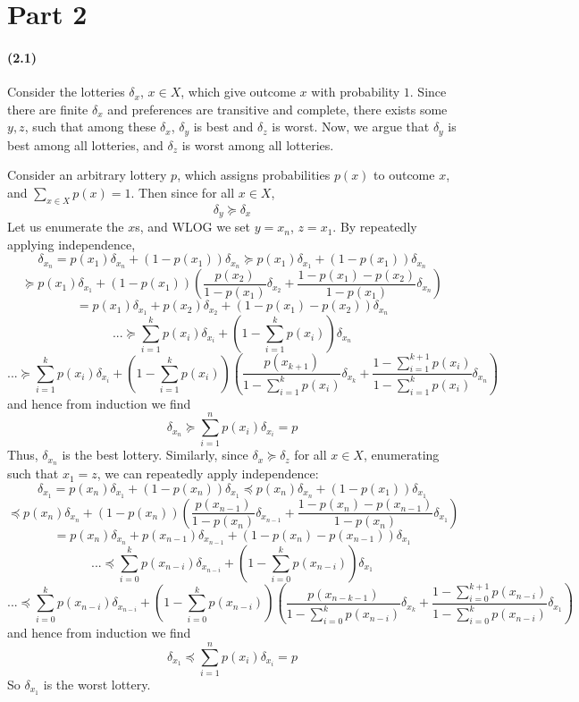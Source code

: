 \documentclass[10pt,letter]{article}
\begin{document}
\section*{Part 2}
\paragraph{(2.1)}
Consider the lotteries $\delta_x$, $x \in X$, which give outcome $x$ with probability $1$. Since there are finite $\delta_x$ and preferences are transitive and complete, there exists some $y,z$, such that among these $\delta_x$, $\delta_y$ is best and $\delta_z$ is worst. Now, we argue that $\delta_y$ is best among all lotteries, and $\delta_z$ is worst among all lotteries.

Consider an arbitrary lottery $p$, which assigns probabilities $p(x)$ to outcome $x$, and $\sum_{x \in X} p(x) = 1$. Then since for all $x \in X$,
\[ \delta_y \succeq \delta_x \]
Let us enumerate the $x$s, and WLOG we set $y = x_n$, $z = x_1$. By repeatedly applying independence,
\[ \delta_{x_n} = p(x_1) \delta_{x_n} + (1-p(x_1))\delta_{x_n}  \succeq  p(x_1) \delta_{x_1} + (1-p(x_1))\delta_{x_n}  \]
\[ \succeq p(x_1) \delta_{x_1} + (1-p(x_1))\left( \frac{p(x_2)}{1-p(x_1)} \delta_{x_2} + \frac{1 - p(x_1) - p(x_2)}{1-p(x_1)}\delta_{x_n} \right)  \]
\[ = p(x_1) \delta_{x_1} + p(x_2) \delta_{x_2} +  (1 - p(x_1) - p(x_2))\delta_{x_n} \]
\[ ... \succeq \sum_{i=1}^k p(x_i)\delta_{x_i} + \left(1 - \sum_{i=1}^k p(x_i)\right) \delta_{x_n} \]
\[ ... \succeq \sum_{i=1}^k p(x_i)\delta_{x_i} + \left(1 - \sum_{i=1}^k p(x_i)\right) \left( \frac{p(x_{k+1})}{1 - \sum_{i=1}^k p(x_i)} \delta_{x_k} + \frac{1 - \sum_{i=1}^{k+1} p(x_i)}{1 - \sum_{i=1}^k p(x_i)} \delta_{x_n} \right) \]
and hence from induction we find
\[ \delta_{x_n} \succeq \sum_{i=1}^n p(x_i)\delta_{x_i} = p \]
Thus, $\delta_{x_n}$ is the best lottery. Similarly, since $\delta_x \succeq \delta_z$ for all $x \in X$, enumerating such that $x_1 = z$, we can repeatedly apply independence:
\[ \delta_{x_1} = p(x_n) \delta_{x_1} + (1-p(x_n))\delta_{x_1}  \preceq  p(x_n) \delta_{x_n} + (1-p(x_1))\delta_{x_1}  \]
\[ \preceq p(x_n) \delta_{x_n} + (1-p(x_n))\left( \frac{p(x_{n-1})}{1-p(x_n)} \delta_{x_{n-1}} + \frac{1 - p(x_n) - p(x_{n-1})}{1-p(x_n)}\delta_{x_1} \right)  \]
\[ = p(x_n) \delta_{x_n} + p(x_{n-1}) \delta_{x_{n-1}} +  (1 - p(x_n) - p(x_{n-1}))\delta_{x_1} \]
\[ ... \preceq \sum_{i=0}^k p(x_{n-i})\delta_{x_{n-i}} + \left(1 - \sum_{i=0}^k p(x_{n-i})\right) \delta_{x_1} \]
\[ ... \preceq \sum_{i=0}^k p(x_{n-i})\delta_{x_{n-i}} + \left(1 - \sum_{i=0}^k p(x_{n-i})\right) \left( \frac{p(x_{n-k-1})}{1 - \sum_{i=0}^k p(x_{n-i})} \delta_{x_k} + \frac{1 - \sum_{i=0}^{k+1} p(x_{n-i})}{1 - \sum_{i=0}^k p(x_{n-i})} \delta_{x_1} \right) \]
and hence from induction we find
\[ \delta_{x_1} \preceq \sum_{i=1}^n p(x_i)\delta_{x_i} = p \]
So $\delta_{x_1}$ is the worst lottery.
\end{document}
